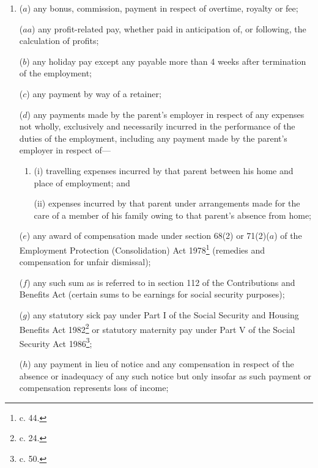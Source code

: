 \documentclass[12pt,a4paper]{article}
\begin{document}
\begin{enumerate}\item[]
($a$) any bonus, commission, 
payment in respect of overtime,  %
royalty or fee;

($aa$) any profit-related pay, whether paid in anticipation of, or following, the calculation of profits;

($b$) any holiday pay except any payable more than 4 weeks after termination of the employment;

($c$) any payment by way of a retainer;


($d$) any payments made by the parent’s employer in respect of any expenses not wholly, exclusively and necessarily incurred in the performance of the duties of the employment, including any payment made by the parent’s employer in respect of—
\begin{enumerate}\item[]
(i) travelling expenses incurred by that parent between his home and place of employment; and

(ii) expenses incurred by that parent under arrangements made for the care of a member of his family owing to that parent’s absence from home;
\end{enumerate}

($e$) any award of compensation made under section 68(2) or 71(2)($a$) of the Employment Protection (Consolidation) Act 1978\footnote{ c. 44.} (remedies and compensation for unfair dismissal);

($f$) any such sum as is referred to in section 112 of the Contributions and Benefits Act (certain sums to be earnings for social security purposes);

($g$) any statutory sick pay under Part I of the Social Security and Housing Benefits Act 1982\footnote{ c. 24.} or statutory maternity pay under Part V of the Social Security Act 1986\footnote{ c. 50.};

($h$) any payment in lieu of notice and any compensation in respect of the absence or inadequacy of any such notice but only insofar as such payment or compensation represents loss of income;


\end{enumerate}
\end{document}
